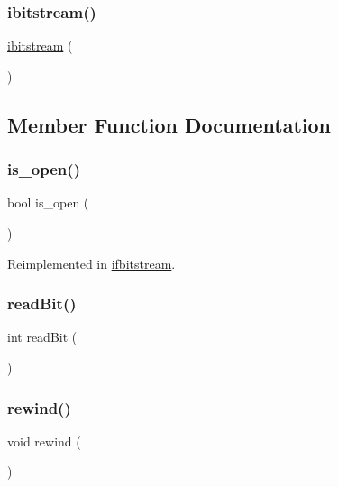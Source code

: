 \subsubsection{\texorpdfstring{ibitstream()}{ibitstream()}}
{\footnotesize\ttfamily \mbox{\hyperlink{classibitstream}{ibitstream}} (\begin{DoxyParamCaption}{ }\end{DoxyParamCaption})}



\subsection{Member Function Documentation}
\mbox{\label{classibitstream_a2f57f54d8c03b615bb31eee091d8a88a}} 
\subsubsection{\texorpdfstring{is\+\_\+open()}{is\_open()}}
{\footnotesize\ttfamily bool is\+\_\+open (\begin{DoxyParamCaption}{ }\end{DoxyParamCaption})\hspace{0.3cm}{\ttfamily [virtual]}}



Reimplemented in \mbox{\hyperlink{classifbitstream_a2f57f54d8c03b615bb31eee091d8a88a}{ifbitstream}}.

\mbox{\label{classibitstream_aa8c615fa7957fb0232a0873dadbd39e8}} 
\subsubsection{\texorpdfstring{read\+Bit()}{readBit()}}
{\footnotesize\ttfamily int read\+Bit (\begin{DoxyParamCaption}{ }\end{DoxyParamCaption})}

\mbox{\label{classibitstream_ab8734e666421c9fe3b6380a818c6c727}} 
\subsubsection{\texorpdfstring{rewind()}{rewind()}}
{\footnotesize\ttfamily void rewind (\begin{DoxyParamCaption}{ }\end{DoxyParamCaption})}

